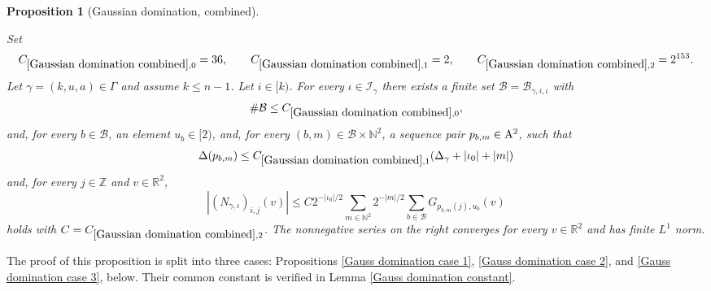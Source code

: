 \documentclass[12pt,reqno]{amsart}
\theoremstyle{plain}
\newtheorem{proposition}[theorem]{Proposition}
\numberwithin{equation}{section}
\theoremstyle{remark}
\newcommand{\uses}[1]{}
\newcommand{\usesdefs}[1]{}
\newcommand{\leanok}{}
\newcommand{\lean}[1]{}
\newcommand{\Z}{{\mathbb Z}}
\newcommand{\R}{{\mathbb R}}
\newcommand{\N}{{\mathbb N}}
\begin{document}
\begin{proposition}[Gaussian domination, combined]\label{Gaussian domination combined}\uses{Gauss domination case 1,Gauss domination case 2,Gauss domination case 3,Gauss domination constant}\usesdefs{multiplicatively spaced monotone sequences,geometric parameters,2D Gaussians,L multiplier,N multiplier}
\lean{Auto.gaussianDominationCombined}
\leanok
Set
\begin{equation}\label{Gaussian domination combined constants}
C_{\ref{Gaussian domination combined},0}=36,\qquad
C_{\ref{Gaussian domination combined},1}=2,\qquad
C_{\ref{Gaussian domination combined},2}=2^{153}.
\end{equation}\label{auto:Gaussian-domination-combined-distance-constant}\label{auto:Gaussian-domination-combined-majorant-constant}
Let $\gamma=(k,u,a)\in\Gamma$ and assume $k\le n-1$. Let $i\in[k)$. For every $\iota\in\mathcal I_\gamma$ there exists a finite set $\mathcal B=\mathcal B_{\gamma,i,\iota}$ with
\begin{equation}\label{auto:Gaussian-domination-index-cardinality}
\#\mathcal B\le C_{\ref{Gaussian domination combined},0},
\end{equation}
and, for every $b\in\mathcal B$, an element $u_b\in[2)$, and, for every $(b,m)\in\mathcal B\times\N^2$, a sequence pair $p_{b,m}\in{\rm A}^2$, such that
\begin{equation}\label{Gaussian domination combined distance}
\Delta(p_{b,m})\le C_{\ref{Gaussian domination combined},1}(\Delta_\gamma+|\iota_0|+|m|)
\end{equation}
and, for every $j\in\Z$ and $v\in\R^2$,
\begin{equation}\label{Gaussian domination main estimate}
|(N_{\gamma,\iota})_{i,j}(v)|
\le C 2^{-|\iota_0|/2}
\sum_{m\in\N^2}2^{-|m|/2}
\sum_{b\in\mathcal B}G_{p_{b,m}(j),u_b}(v)
\end{equation}
holds with $C=C_{\ref{Gaussian domination combined},2}$.
The nonnegative series on the right converges for every $v\in\R^2$ and has finite $L^1$ norm.
\end{proposition}

The proof of this proposition is split into three cases: Propositions \ref{Gauss domination case 1}, \ref{Gauss domination case 2}, and \ref{Gauss domination case 3}, below. Their common constant is verified in Lemma \ref{Gauss domination constant}.
\end{document}
